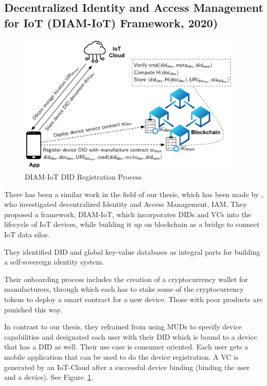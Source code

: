\subsection{Decentralized Identity and Access Management for IoT (DIAM-IoT) Framework, 2020)} %
\label{sub:Decentralized Identity and Access Management for IoT}

\begin{figure}
	\begin{center}
		\includegraphics[width=0.95\textwidth]{figures/diam-iot-did-registration.png}
	\end{center}
	\caption{DIAM-IoT DID Registration Process \cite{diam-iot-2020}}
	\label{fig:diam-iot-did-registration}
\end{figure}

There has been a similar work in the field of our thesis, which has been made by \cite{diam-iot-2020}, who investigated
decentralized Identity and Access Management, IAM. They proposed a framework, DIAM-IoT, which incorporates DIDs and VCs
into the lifecycle of IoT devices, while building it up on blockchain as a bridge to connect IoT data silos.

They identified DID and global key-value databases as integral parts for building a self-sovereign identity system.

Their onboarding process includes the creation of a cryptocurrency wallet for manufacturers, through which each has to
stake some of the cryptocurrency tokens to deploy a smart contract for a new device. Those with poor products are
punished this way.

In contrast to our thesis, they refrained from using MUDs to specify device capabilities and designated each user with
their DID which is bound to a device that has a DID as well. Their use case is consumer oriented. Each user gets a
mobile application that can be used to do the device registration. A VC is generated by an IoT-Cloud after a successful
device binding (binding the user and a device). See Figure~\ref{fig:diam-iot-did-registration}.

